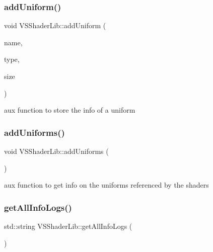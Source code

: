 \subsubsection{\texorpdfstring{add\+Uniform()}{addUniform()}}
{\footnotesize\ttfamily void V\+S\+Shader\+Lib\+::add\+Uniform (\begin{DoxyParamCaption}\item[{std\+::string}]{name,  }\item[{G\+Lenum}]{type,  }\item[{unsigned int}]{size }\end{DoxyParamCaption})\hspace{0.3cm}{\ttfamily [protected]}}



aux function to store the info of a uniform 

\mbox{\label{class_v_s_shader_lib_abc505e5c5799a80a1752e645647fcb1e}} 
\subsubsection{\texorpdfstring{add\+Uniforms()}{addUniforms()}}
{\footnotesize\ttfamily void V\+S\+Shader\+Lib\+::add\+Uniforms (\begin{DoxyParamCaption}{ }\end{DoxyParamCaption})\hspace{0.3cm}{\ttfamily [protected]}}



aux function to get info on the uniforms referenced by the shaders 

\mbox{\label{class_v_s_shader_lib_ad3017d7299373b0295ad6ec2cdff93f3}} 
\subsubsection{\texorpdfstring{get\+All\+Info\+Logs()}{getAllInfoLogs()}}
{\footnotesize\ttfamily std\+::string V\+S\+Shader\+Lib\+::get\+All\+Info\+Logs (\begin{DoxyParamCaption}{ }\end{DoxyParamCaption})}



